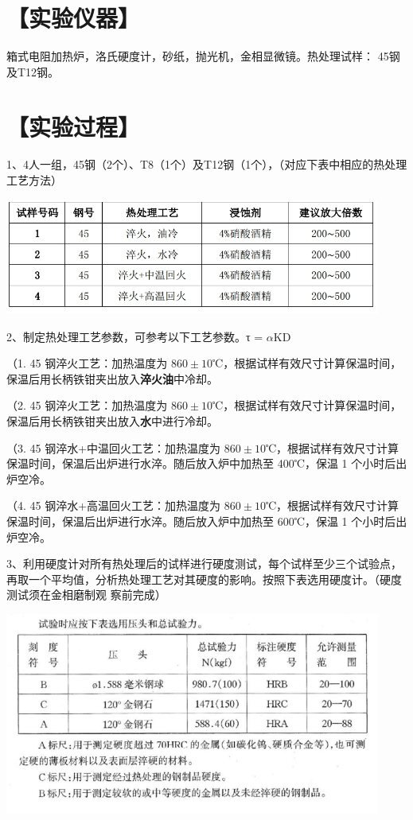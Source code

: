 \documentclass[a4paper,utf8]{article}
\begin{document}
\section*{【实验仪器】}%
箱式电阻加热炉，洛氏硬度计，砂纸，抛光机，金相显微镜。热处理试样：
45钢及T12钢。
\section*{【实验过程】}%
1、4人一组，45钢（2个）、T8（1个）及T12钢（1个），（对应下表中相应的热处理工艺方法）

\begin{center}
    \includegraphics[width=350pt]{3.png}
\end{center}

2、制定热处理工艺参数，可参考以下工艺参数。τ = $\alpha$KD


（1. 45 钢淬火工艺：加热温度为 $860 \pm 10$℃，根据试样有效尺寸计算保温时间，保温后用长柄铁钳夹出放入\textbf{淬火油}中冷却。

（2. 45 钢淬火工艺：加热温度为 $860 \pm 10$℃，根据试样有效尺寸计算保温时间，保温后用长柄铁钳夹出放入\textbf{水}中进行冷却。

（3. 45 钢淬水+中温回火工艺：加热温度为 $860 \pm 10$℃，根据试样有效尺寸计算保温时间，保温后出炉进行水淬。随后放入炉中加热至 400℃，保温 1 个小时后出炉空冷。

（4. 45 钢淬水+高温回火工艺：加热温度为 $860 \pm 10$℃，根据试样有效尺寸计算保温时间，保温后出炉进行水淬。随后放入炉中加热至 600℃，保温 1 个小时后出炉空冷。


3、利用硬度计对所有热处理后的试样进行硬度测试，每个试样至少三个试验点，再取一个平均值，分析热处理工艺对其硬度的影响。按照下表选用硬度计。（硬度测试须在金相磨制观
察前完成）

\begin{center}
    \includegraphics[width=350pt]{4.png}
\end{center}
\end{document}
